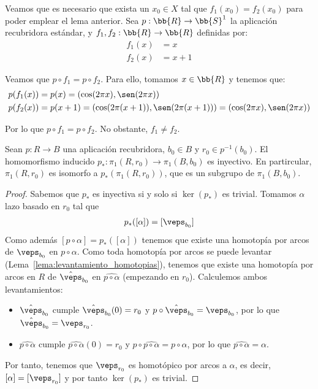 \begin{ejemplo}
    Veamos que es necesario que exista un $x_0\in X$ tal que $f_1(x_0)=f_2(x_0)$ para poder emplear el lema anterior. Sea $p:\bb{R}\to \bb{S}^1$ la aplicación recubridora estándar, y $f_1,f_2:\bb{R}\to \bb{R}$ definidas por:
    \begin{align*}
        f_1(x) &= x\\
        f_2(x) &= x+1
    \end{align*}

    Veamos que $p\circ f_1 = p\circ f_2$. Para ello, tomamos $x\in \bb{R}$ y tenemos que:
    \begin{align*}
        p(f_1(x)) &= p(x) = (\cos(2\pi x), \sen(2\pi x))\\
        p(f_2(x)) &= p(x+1) = (\cos(2\pi (x+1)), \sen(2\pi (x+1))) = (\cos(2\pi x), \sen(2\pi x))
    \end{align*}

    Por lo que $p\circ f_1 = p\circ f_2$. No obstante, $f_1\neq f_2$.
\end{ejemplo}

\begin{teo}[de Monodromía]
    Sean $p:R \to B$ una aplicación recubridora, $b_0\in B$ y $r_0\in p^{-1}(b_0)$. El homomorfismo inducido $p_*:\pi_1(R,r_0)\to \pi_1(B,b_0)$ es inyectivo. En partircular, $\pi_1(R,r_0)$ es isomorfo a $p_*(\pi_1(R,r_0))$, que es un subgrupo de $\pi_1(B,b_0)$.
    \begin{proof}
        Sabemos que $p_*$ es inyectiva si y solo si $\ker(p_*)$ es trivial. Tomamos $\alpha$ lazo basado en $r_0$ tal que 
        \begin{gather*}
            p_*([\alpha]) = [\veps_{b_0}]
        \end{gather*}
        Como además $[p\circ \alpha] = p_*([\alpha])$ tenemos que existe una homotopía por arcos de $\veps_{b_0}$ en $p\circ \alpha$. Como toda homotopía por arcos se puede levantar (Lema~\ref{lema:levantamiento_homotopias}), tenemos que existe una homotopía por arcos en $R$ de $\hat{\veps}_{b_0}$ en $\widehat{p\circ \alpha}$ (empezando en $r_0$). Calculemos ambos levantamientos:
        \begin{itemize}
            \item $\hat{\veps}_{b_0}$ cumple $\hat{\veps}_{b_0}(0) = r_0$ y $p\circ \hat{\veps}_{b_0} = \veps_{b_0}$, por lo que $\hat{\veps}_{b_0} = \veps_{r_0}$.
            \item $\widehat{p\circ \alpha}$ cumple $\widehat{p\circ \alpha}(0) = r_0$ y $p\circ \widehat{p\circ \alpha} = p\circ \alpha$, por lo que $\widehat{p\circ \alpha} = \alpha$.
        \end{itemize}

        Por tanto, tenemos que $\veps_{r_0}$ es homotópico por arcos a $\alpha$, es decir, $[\alpha] = [\veps_{r_0}]$ y por tanto $\ker(p_*)$ es trivial.
    \end{proof}
\end{teo}

